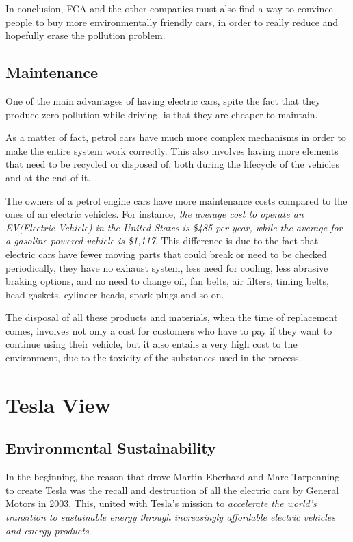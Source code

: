 In conclusion, FCA and the other companies must also find a way to convince people to buy more environmentally friendly cars, in order to really reduce and hopefully erase the pollution problem.

\subsection{Maintenance}

One of the main advantages of having electric cars, spite the fact that they produce zero pollution while driving, is that they are cheaper to maintain. 

As a matter of fact, petrol cars have much more complex mechanisms in order to make the entire system work correctly. This also involves having more elements that need to be recycled or disposed of, both during the lifecycle of the vehicles and at the end of it.

The owners of a petrol engine cars have more maintenance costs compared to the ones of an electric vehicles. For instance, \emph{the average cost to operate an EV(Electric Vehicle) in the United States is \$485 per year, while the average for a gasoline-powered vehicle is \$1,117}\cite{maintenance_costs}. 
This difference is due to the fact that electric cars have fewer moving parts that could break or need to be checked periodically, they have no exhaust system, less need for cooling, less abrasive braking options, and no need to change oil, fan belts, air filters, timing belts, head gaskets, cylinder heads, spark plugs and so on\cite{maintenance_costs}.

The disposal of all these products and materials, when the time of replacement comes, involves not only a cost for customers who have to pay if they want to continue using their vehicle, but it also entails a very high cost to the environment, due to the toxicity of the substances used in the process.


\section{Tesla View}

\subsection{Environmental Sustainability}
In the beginning, the reason that drove Martin Eberhard and Marc Tarpenning to create Tesla was the recall and destruction of all the electric cars by General Motors\cite{muskGM} in 2003. This, united with Tesla's mission to \emph{accelerate the world’s transition to sustainable energy through increasingly affordable electric vehicles and energy products}\cite{aboutTesla}.

